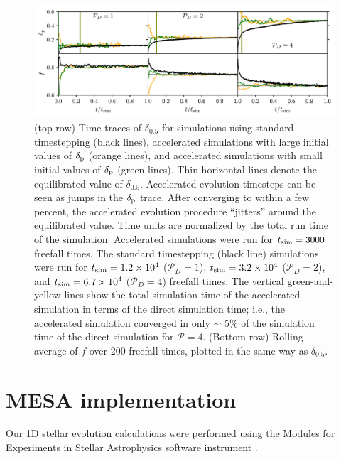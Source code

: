 \documentclass[twocolumn, linenumbers]{aastex631}
\newcommand{\delp}{\ensuremath{\delta_{\rm{p}}}}
\newcommand{\mP}{\ensuremath{\mathcal{P}}}
\begin{document}
\begin{figure}[t]
\centering
\includegraphics[width=\textwidth]{AE_time_figure.pdf}
\caption{
\label{fig:AE_time_figure}
(top row) Time traces of $\delta_{0.5}$ for simulations using standard timestepping (black lines), accelerated simulations with large initial values of $\delp$ (orange lines), and accelerated simulations with small initial values of $\delp$ (green lines).
Thin horizontal lines denote the equilibrated value of $\delta_{0.5}$.
Accelerated evolution timesteps can be seen as jumps in the $\delp$ trace.
After converging to within a few percent, the accelerated evolution procedure ``jitters'' around the equilibrated value.
Time units are normalized by the total run time of the simulation.
Accelerated simulations were run for $t_{\rm{sim}} = 3000$ freefall times.
The standard timestepping (black line) simulations were run for $t_{\rm{sim}} = 1.2 \times 10^4$ ($\mP_D = 1$), $t_{\rm{sim}} = 3.2 \times 10^4$ ($\mP_D = 2$), and $t_{\rm{sim}} = 6.7 \times 10^4$ ($\mP_D = 4$) freefall times.
The vertical green-and-yellow lines show the total simulation time of the accelerated simulation in terms of the direct simulation time; i.e., the accelerated simulation converged in only $\sim$ 5\% of the simulation time of the direct simulation for $\mP = 4$.
(Bottom row) Rolling average of $f$ over 200 freefall times, plotted in the same way as $\delta_{0.5}$.
}
\end{figure}





\section{MESA implementation}
\label{app:mesa}

Our 1D stellar evolution calculations were performed using the Modules for Experiments in Stellar Astrophysics software instrument \citep[MESA]{paxton_etal_2011, paxton_etal_2013, paxton_etal_2015, paxton_etal_2018, paxton_etal_2019}.
\end{document}
